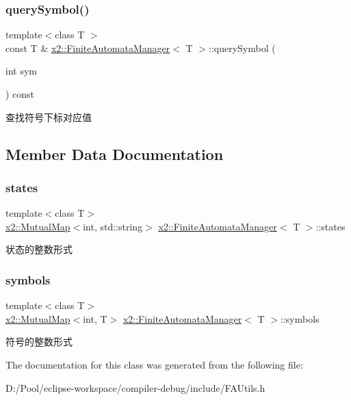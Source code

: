 \subsubsection{\texorpdfstring{query\+Symbol()}{querySymbol()}}
{\footnotesize\ttfamily template$<$class T $>$ \\
const T \& \hyperlink{classx2_1_1_finite_automata_manager}{x2\+::\+Finite\+Automata\+Manager}$<$ T $>$\+::query\+Symbol (\begin{DoxyParamCaption}\item[{int}]{sym }\end{DoxyParamCaption}) const\hspace{0.3cm}{\ttfamily [inline]}}

查找符号下标对应值 

\subsection{Member Data Documentation}
\mbox{\label{classx2_1_1_finite_automata_manager_a54a0b0aba6cf5b0d1e04dd966e7c83fc}} 
\subsubsection{\texorpdfstring{states}{states}}
{\footnotesize\ttfamily template$<$class T$>$ \\
\hyperlink{classx2_1_1_mutual_map}{x2\+::\+Mutual\+Map}$<$int, std\+::string$>$ \hyperlink{classx2_1_1_finite_automata_manager}{x2\+::\+Finite\+Automata\+Manager}$<$ T $>$\+::states\hspace{0.3cm}{\ttfamily [protected]}}

状态的整数形式 \mbox{\label{classx2_1_1_finite_automata_manager_ae0f30598da4c83462fb78d93a3878f4a}} 
\subsubsection{\texorpdfstring{symbols}{symbols}}
{\footnotesize\ttfamily template$<$class T$>$ \\
\hyperlink{classx2_1_1_mutual_map}{x2\+::\+Mutual\+Map}$<$int, T$>$ \hyperlink{classx2_1_1_finite_automata_manager}{x2\+::\+Finite\+Automata\+Manager}$<$ T $>$\+::symbols\hspace{0.3cm}{\ttfamily [protected]}}

符号的整数形式 

The documentation for this class was generated from the following file\+:\begin{DoxyCompactItemize}
\item 
D\+:/\+Pool/eclipse-\/workspace/compiler-\/debug/include/F\+A\+Utils.\+h\end{DoxyCompactItemize}
